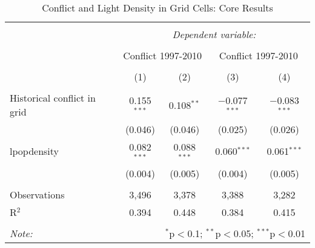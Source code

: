 
\begin{table}[!htbp] \centering 
  \caption{Conflict and Light Density in Grid Cells: Core Results} 
  \label{} 
\footnotesize 
\begin{tabular}{@{\extracolsep{2pt}}lcccc} 
\\[-1.8ex]\hline 
\hline \\[-1.8ex] 
 & \multicolumn{4}{c}{\textit{Dependent variable:}} \\ 
\cline{2-5} 
\\[-1.8ex] & \multicolumn{2}{c}{Conflict 1997-2010} & \multicolumn{2}{c}{Conflict 1997-2010} \\ 
\\[-1.8ex] & (1) & (2) & (3) & (4)\\ 
\hline \\[-1.8ex] 
 Historical conflict in grid & 0.155$^{***}$ & 0.108$^{**}$ & $-$0.077$^{***}$ & $-$0.083$^{***}$ \\ 
  & (0.046) & (0.046) & (0.025) & (0.026) \\ 
  lpopdensity & 0.082$^{***}$ & 0.088$^{***}$ & 0.060$^{***}$ & 0.061$^{***}$ \\ 
  & (0.004) & (0.005) & (0.004) & (0.005) \\ 
 \hline \\[-1.8ex] 
Observations & 3,496 & 3,378 & 3,388 & 3,282 \\ 
R$^{2}$ & 0.394 & 0.448 & 0.384 & 0.415 \\ 
\hline 
\hline \\[-1.8ex] 
\textit{Note:}  & \multicolumn{4}{r}{$^{*}$p$<$0.1; $^{**}$p$<$0.05; $^{***}$p$<$0.01} \\ 
\end{tabular} 
\end{table} 

